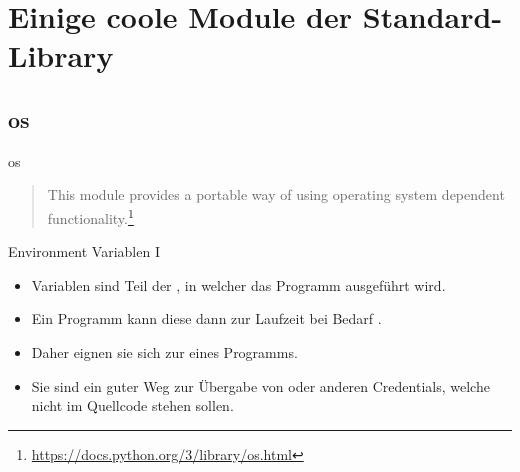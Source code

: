 \documentclass[12pt, aspectratio=169, usepdftitle=false]{beamer}
\newcommand{\furl}[1]{\footnote{\url{#1}}}
\begin{document}
\framecardfragen


\section{Einige coole Module der Standard-Library}
\subsection{os}

\begin{frame}{os}
	\begin{quotation}
		This module provides a portable way of using operating system dependent functionality.\furl{https://docs.python.org/3/library/os.html}
	\end{quotation}
\end{frame}


\begin{frame}[fragile]{Environment Variablen I}
	\begin{itemize}
		\item {} Variablen sind Teil der , in welcher das Programm ausgeführt wird.
		\pause
		\item Ein Programm kann diese dann zur Laufzeit bei Bedarf .
		\pause
		\item Daher eignen sie sich zur  eines Programms.
		\pause
		\item Sie sind ein guter Weg zur Übergabe von  oder anderen Credentials, welche nicht im Quellcode stehen sollen.
		
	\end{itemize}

	
\end{frame}
\end{document}
